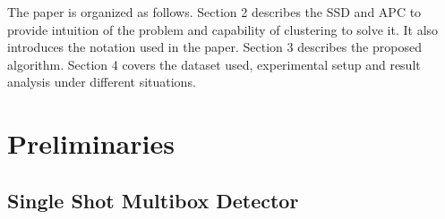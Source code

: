 \documentclass[conference]{IEEEtran}
\begin{document}
The paper is organized as follows. Section 2 describes the SSD and APC to provide intuition of the problem and capability of clustering to solve it. It also introduces the notation used in the paper. Section 3 describes the proposed algorithm. Section 4 covers the dataset used, experimental setup and result analysis under different situations. 

\section{Preliminaries}
\subsection{Single Shot Multibox Detector}
\end{document}
